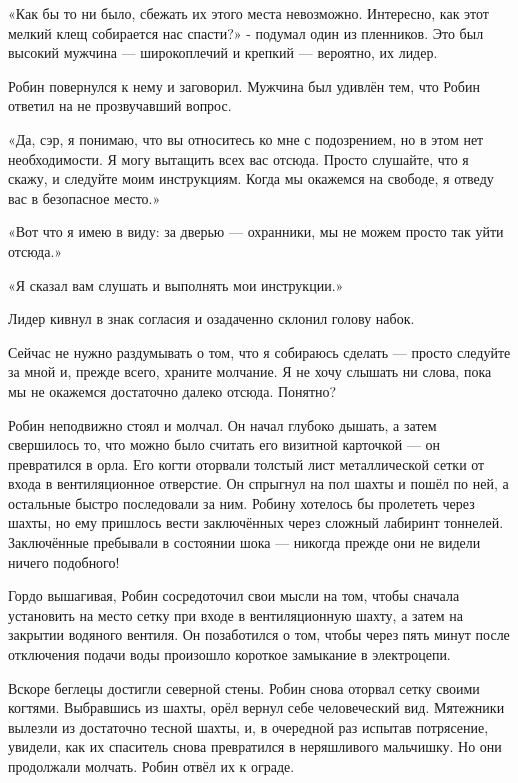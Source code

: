 \documentclass[a4paper,12pt]{book}
\begin{document}
\par
«Как бы то ни было, сбежать их этого места невозможно. Интересно, как этот мелкий клещ собирается нас спасти?» - подумал один из пленников. Это был высокий мужчина — широкоплечий и крепкий — вероятно, их лидер.
\par
Робин повернулся к нему и заговорил. Мужчина был удивлён тем, что Робин ответил на не прозвучавший вопрос.
\par
«Да, сэр, я понимаю, что вы относитесь ко мне с подозрением, но в этом нет необходимости. Я могу вытащить всех вас отсюда. Просто слушайте, что я скажу, и следуйте моим инструкциям. Когда мы окажемся на свободе, я отведу вас в безопасное место.»
\par
«Вот что я имею в виду: за дверью — охранники, мы не можем просто так уйти отсюда.»
\par
«Я сказал вам слушать и выполнять мои инструкции.»
\par
Лидер кивнул в знак согласия и озадаченно склонил голову набок.
\par
Сейчас не нужно раздумывать о том, что я собираюсь сделать — просто следуйте за мной и, прежде всего, храните молчание. Я не хочу слышать ни слова, пока мы не окажемся достаточно далеко отсюда. Понятно?\\
\par
Робин неподвижно стоял и молчал. Он начал глубоко дышать, а затем свершилось то, что можно было считать его визитной карточкой — он превратился в орла. Его когти оторвали толстый лист металлической сетки от входа в вентиляционное отверстие. Он спрыгнул на пол шахты и пошёл по ней, а остальные быстро последовали за ним. Робину хотелось бы пролететь через шахты, но ему пришлось вести заключённых через сложный лабиринт тоннелей. Заключённые пребывали в состоянии шока — никогда прежде они не видели ничего подобного!
\par
Гордо вышагивая, Робин сосредоточил свои мысли на том, чтобы сначала установить на место сетку при входе в вентиляционную шахту, а затем на закрытии водяного вентиля. Он позаботился о том, чтобы через пять минут после отключения подачи воды произошло короткое замыкание в электроцепи.
\par
Вскоре беглецы достигли северной стены. Робин снова оторвал сетку своими когтями. Выбравшись из шахты, орёл вернул себе человеческий вид. Мятежники вылезли из достаточно тесной шахты, и, в очередной раз испытав потрясение, увидели, как их спаситель снова превратился в неряшливого мальчишку. Но они продолжали молчать. Робин отвёл их к ограде.
\end{document}
